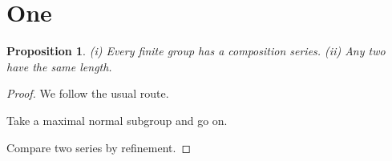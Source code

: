 \documentclass{article}
\newtheorem{proposition}{Proposition}[section]
\begin{document}
\section{One}

\begin{proposition}
(i) Every finite group has a composition series. (ii) Any two have the
same length.
\end{proposition}

\begin{proof}
We follow the usual route.

 Take a maximal normal subgroup and go on.

 Compare two series by refinement.
\end{proof}
\end{document}
